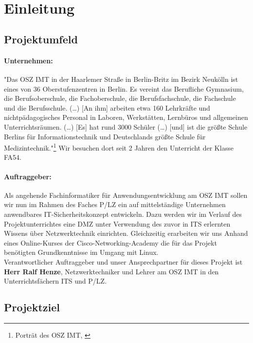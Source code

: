 \section{Einleitung}
\label{sec:Einleitung}

\subsection{Projektumfeld} 
\label{sec:Projektumfeld}
\paragraph*{Unternehmen: } "Das OSZ IMT  in der Haarlemer Straße in Berlin-Britz im Bezirk Neukölln ist eines von 36 Oberstufenzentren in Berlin. Es vereint das Berufliche Gymnasium, die Berufsoberschule, die Fachoberschule, die Berufsfachschule, die Fachschule und die Berufsschule. (\dots)
[An ihm] arbeiten etwa 160 Lehrkräfte und nichtpädagogisches Personal in Laboren, Werkstätten, Lernbüros und allgemeinen Unterrichtsräumen. (\dots)
[Es] hat rund 3000 Schüler (\dots) [und] ist die größte Schule Berlins für Informationstechnik und Deutschlands größte Schule für Medizintechnik."\footnote{Porträt des OSZ IMT, \cite{oszimtDe} }
Wir besuchen dort seit 2  Jahren den Unterricht der Klasse \ac{FA54}.
\paragraph*{Auftraggeber: } Als angehende Fachinformatiker für Anwendungsentwicklung am \ac{OSZ IMT} sollen wir nun im Rahmen des Faches \ac{P/LZ} ein auf mittelständige Unternehmen anwendbares \ac{IT}-Sicherheitskonzept entwickeln. Dazu werden wir im Verlauf des Projektunterrichtes eine \ac{DMZ} unter Verwendung des zuvor in \ac{ITS} erlernten Wissens über Netzwerktechnik einrichten.  Gleichzeitig erarbeiten wir uns Anhand eines Online-Kurses der Cisco-Networking-Academy die für das Projekt benötigten Grundkenntnisse im Umgang mit Linux.\\
Verantwortlicher Auftraggeber und unser Ansprechpartner für dieses Projekt ist \textbf{Herr Ralf Henze}, Netzwerktechniker und Lehrer am \ac{OSZ IMT} in den Unterrichtsfächern \ac{ITS} und \ac{P/LZ}.

\subsection{Projektziel} 
\label{sec:Projektziel}
